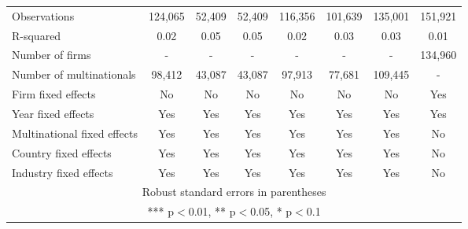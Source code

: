\begin{tabular}{lccccccc}
Observations & 124,065 & 52,409 & 52,409 & 116,356 & 101,639 & 135,001 & 151,921 \\
R-squared & 0.02 & 0.05 & 0.05 & 0.02 & 0.03 & 0.03 & 0.01 \\
Number of firms & - & - & - & - & - & - & 134,960 \\
Number of multinationals & 98,412 & 43,087 & 43,087 & 97,913 & 77,681 & 109,445 & - \\
Firm fixed effects & No & No & No & No & No & No & Yes \\
Year fixed effects & Yes & Yes & Yes & Yes & Yes & Yes & Yes \\
Multinational fixed effects & Yes & Yes & Yes & Yes & Yes & Yes & No \\
Country fixed effects & Yes & Yes & Yes & Yes & Yes & Yes & No \\
 Industry fixed effects & Yes & Yes & Yes & Yes & Yes & Yes & No \\ \hline
\multicolumn{8}{c}{ Robust standard errors in parentheses} \\
\multicolumn{8}{c}{ *** p$<$0.01, ** p$<$0.05, * p$<$0.1} \\
\end{tabular}
